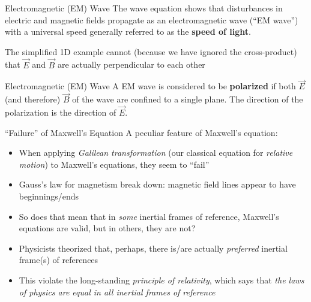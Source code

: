 \documentclass[12pt,aspectratio=169]{beamer}
\begin{document}
\begin{frame}{Electromagnetic (EM) Wave}
  The wave equation shows that disturbances in electric and magnetic fields
  propagate as an electromagnetic wave (``EM wave'') with a universal speed
  generally referred to as the \textbf{speed of light}.


  The simplified 1D example cannot (because we have ignored the cross-product)
  that $\vec E$ and $\vec B$ are actually perpendicular to each other
\end{frame}



\begin{frame}{Electromagnetic (EM) Wave}
  A EM wave is considered to be \textbf{polarized} if both $\vec E$
  (and therefore) $\vec B$ of the wave are confined to a single plane. The
  direction of the polarization is the direction of $\vec E$.
  \begin{center}
  \end{center}
\end{frame}



\begin{frame}{``Failure'' of Maxwell's Equation}
  A peculiar feature of Maxwell's equation:
  \begin{itemize}
  \item When applying \emph{Galilean transformation} (our classical equation for
    \emph{relative motion}) to Maxwell's equations, they seem to ``fail''
  \item Gauss's law for magnetism break down: magnetic field lines appear to
    have beginnings/ends
  \item So does that mean that in \emph{some} inertial frames of reference,
    Maxwell's equations are valid, but in others, they are not?
  \item Physicists theorized that, perhaps, there is/are actually
    \emph{preferred} inertial frame(s) of references
  \item This violate the long-standing \emph{principle of relativity}, which
    says that \emph{the laws of physics are equal in all inertial frames of
      reference}
  \end{itemize}
\end{frame}
\end{document}
